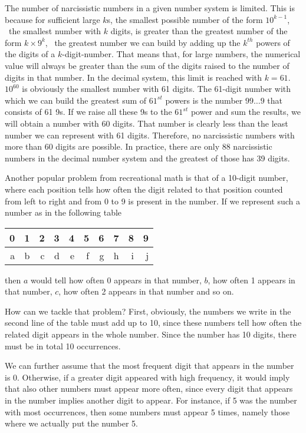 \documentclass{scrreprt}
\begin{document}
The number of narcissistic numbers in a given number system is limited. 
This is because for sufficient large $k$s,
the smallest possible number of the form $10^{k-1}$, 
\ie\ the smallest number with $k$ digits,
is greater than the greatest number of the form $k \times 9^k$,
\ie\ the greatest number we can build by adding up
the $k^{th}$ powers of the digits of a $k$-digit-number.
That means that, for large numbers, the numerical value 
will always be greater than the sum of the digits raised to 
the number of digits in that number.
In the decimal system, this limit is reached with $k = 61$.
$10^{60}$ is obviously the smallest number with 61 digits.
The 61-digit number with which we can build the greatest 
sum of $61^{st}$ powers is the number $99\dots9$ that consists
of 61 9s. If we raise all these 9s to the $61^{st}$ power
and sum the results, we will obtain a number 
with 60 digits. That number is clearly less than
the least number we can represent with 61 digits.
Therefore, no narcissistic numbers with more than 60 digits are possible.
In practice, there are only 88 narcissistic numbers 
in the decimal number system and the greatest of those has 39 digits.

Another popular problem from recreational math
is that of a 10-digit number,
where each position tells
how often the digit related to that position
counted from left to right and from 0 to 9 
is present in the number.
If we represent such a number as in 
the following table

\begin{tabular}{ r r r r r r r r r r}
0 & 1 & 2 & 3 & 4 & 5 & 6 & 7 & 8 & 9\\\hline
a & b & c & d & e & f & g & h & i & j 
\end{tabular}

then $a$ would tell how often 0
appears in that number,
$b$, how often 1 appears in that number,
$c$, how often 2 appears in that number
and so on.

How can we tackle that problem?
First, obviously, the numbers we write
in the second line of the table
must add up to 10,
since these numbers tell how often
the related digit appears in the whole number.
Since the number has 10 digits,
there must be in total 10 occurrences.

We can further assume
that the most frequent digit 
that appears in the number is 0.
Otherwise, if a greater digit
appeared with high frequency,
it would imply that also
other numbers must appear more often,
since every digit that appears in the number
implies another digit to appear.
For instance, if 5 was the number
with most occurrences, then 
some numbers must appear 5 times,
namely those where we actually put the number 5.
\end{document}
